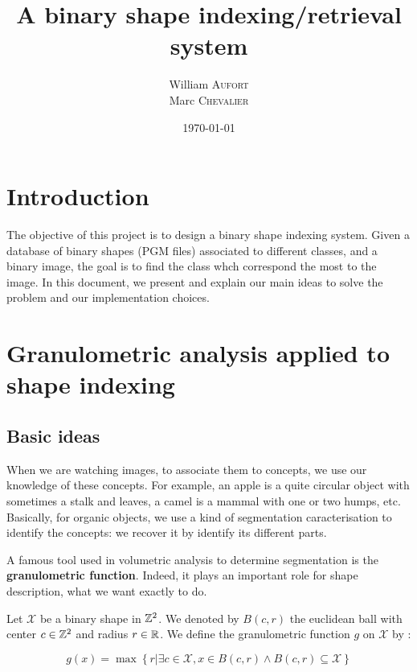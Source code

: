 

\title{A binary shape indexing/retrieval system}
\author{
    William \textsc{Aufort}\\
    Marc \textsc{Chevalier}
}
\date{\today}


\maketitle

\section*{Introduction}

The objective of this project is to design a binary shape indexing system. Given a database of binary shapes (PGM files) associated to different classes, and a binary image, the goal is to find the class whch correspond the most to the image. In this document, we present and explain our main ideas to solve the problem and our implementation choices.

\section{Granulometric analysis applied to shape indexing}

\subsection{Basic ideas}

When we are watching images, to associate them to concepts, we use our knowledge of these concepts. For example, an apple is a quite circular object with sometimes a stalk and leaves, a camel is a mammal with one or two humps, etc. Basically, for organic objects, we use a kind of segmentation caracterisation to identify the concepts: we recover it by identify its different parts.

A famous tool used in volumetric analysis to determine segmentation is the \textbf{granulometric function}. Indeed, it plays an important role for shape description, what we want exactly to do.

Let $\mathcal{X}$ be a binary shape in $\mathbb{Z}^{2}$. We denoted by $B(c,r)$ the euclidean ball with center $c \in \mathbb{Z}^{2}$ and radius $r \in \mathbb{R}$. We define the granulometric function $g$ on $\mathcal{X}$ by :

$$ g(x) = \operatorname{max} \left\{ r | \exists c \in \mathcal{X}, x \in B(c,r) \wedge B(c,r) \subseteq \mathcal{X} \right\} $$ 


